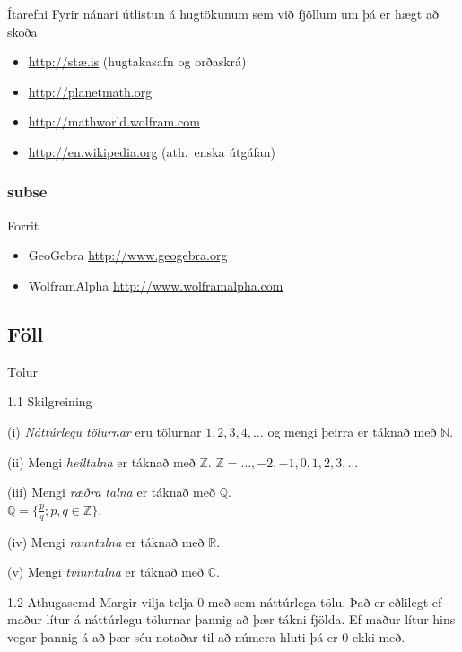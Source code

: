 \documentclass[icelandic,a4paper,12pt]{article}
\newcommand{\C}{{\mathbb  C}}
\newcommand{\Z}{{\mathbb Z}}
\newcommand{\R}{{\mathbb  R}}
\newcommand{\N}{{\mathbb  N}}
\newcommand{\Q}{{\mathbb Q}}
\begin{document}
\begin{frame}{Ítarefni}
 Fyrir nánari útlistun á hugtökunum sem við fjöllum um þá er hægt að skoða
\begin{itemize}
 \item \href{http://stae.is}{http://stæ.is} (hugtakasafn og orðaskrá)
  \item \href{http://planetmath.org}{http://planetmath.org}
  \item \href{http://mathworld.wolfram.com}{http://mathworld.wolfram.com}
  \item \href{http://en.wikipedia.org}{http://en.wikipedia.org} (ath.~enska útgáfan)
\end{itemize}

\pause
\subsubsection*{subse}
\begin{block}{Forrit}
 \begin{itemize}
  \item GeoGebra \href{http://www.geogebra.org}{http://www.geogebra.org}
  \item WolframAlpha \href{http://www.wolframalpha.com}{http://www.wolframalpha.com}
 \end{itemize}

\end{block}


\end{frame}

\subsection*{Föll}	

\begin{frame}{Tölur}

\begin{block}{1.1 Skilgreining}

(i)  \emph{Náttúrlegu tölurnar} eru tölurnar
$1, 2, 3, 4, \ldots$ og mengi þeirra er táknað með $\N$.   \pause

(ii)  Mengi \emph{heiltalna} er táknað með $\Z$. $\Z = \ldots,-2,-1,0,1,2,3,\ldots$\pause

(iii) Mengi \emph{ræðra talna} er táknað með $\Q$. \\$\Q = \{ \frac pq ; p,q \in \Z \}$.\pause

(iv)  Mengi \emph{rauntalna} er táknað með $\R$.\pause

(v)   Mengi \emph{tvinntalna} er táknað með $\C$.
\end{block}

\pause

\begin{block}{1.2 Athugasemd}  
Margir vilja telja $0$ með sem náttúrlega tölu.  Það er eðlilegt ef 
maður lítur á náttúrlegu tölurnar þannig að þær tákni fjölda.  Ef maður lítur hins vegar þannig
á að þær séu notaðar til að númera hluti
þá er 0 ekki með.
\end{block}

\end{frame}
\end{document}
